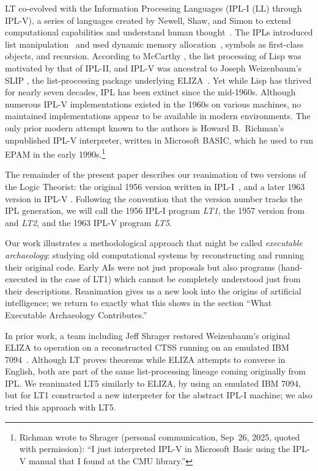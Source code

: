 \documentclass{IEEEcsmag}
\begin{document}
LT co-evolved with the Information Processing Languages (IPL-I (LL) through IPL-V),
a series of languages created by Newell, Shaw, and Simon  
to extend computational capabilities and understand human thought~\cite[p.~II-17]{cip16june1958}.
The IPLs introduced list manipulation~\cite[section~2.6]{knuth1997} and used dynamic memory allocation~\cite{cmuarchiveshawinterview},
symbols as first-class objects, and recursion.
According to McCarthy \cite{HOPLLISP,mccarthy1960lisp}, the 
list processing of Lisp was
motivated by that of IPL-II, and IPL-V was ancestral
to Joseph
Weizenbaum's SLIP \cite{SLIP1963}, the list-processing package underlying ELIZA~\cite{lane2025eliza}.  Yet while Lisp has thrived for
nearly seven decades, IPL has been extinct since the mid-1960s.
Although numerous IPL-V implementations existed in the 1960s on
various machines, no maintained implementations appear to be available
in modern environments. The only prior modern attempt known to the
authors is Howard B.~Richman's unpublished IPL-V interpreter, written in
Microsoft BASIC, which he used to run EPAM in the early
1990s.\footnote{Richman wrote to Shrager
(personal communication, Sep~26, 2025, quoted with
permission): ``I just interpreted IPL-V in Microsoft Basic using the
IPL-V manual that I found at the CMU library.''}

The remainder of the present paper describes our
reanimation of two versions of the Logic Theorist:
the original 1956 version written in IPL-I~\cite{LT1956b}, and a  
later 1963 version in IPL-V \cite{stefferud1963lt}.  Following the convention
that the version number tracks the IPL generation, we will call the
1956 IPL-I program \emph{LT1}, the 1957 version
from \cite{LT1957} and \cite{newellshaw1957} \emph{LT2},
and the 1963 IPL-V program \emph{LT5}.

Our work illustrates a methodological approach that might be called
\emph{executable archaeology}: studying old computational systems by
reconstructing and running their original code. Early AIs were not
just proposals but also programs (hand-executed in the case of LT1)
which cannot be completely understood just from their descriptions.
Reanimation gives us a new look into the origins of artificial
intelligence; we return to exactly what this shows in
the section ``What Executable Archaeology Contributes.''

In prior work, a team including Jeff Shrager restored
Weizenbaum's original ELIZA to operation on a reconstructed CTSS
running on an emulated IBM 7094~\cite{lane2025eliza}. Although 
LT proves theorems while ELIZA attempts to converse in English,
both are part of the same list-processing lineage coming originally
from IPL.  We reanimated LT5 similarly to ELIZA, by using
an emulated IBM 7094, but for LT1 constructed a new interpreter
for the abstract IPL-I machine; we also tried this approach
with LT5.
\end{document}
